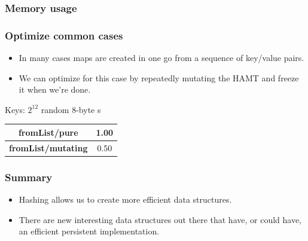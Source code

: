 \documentclass[xetex,mathserif,serif]{beamer}
\newcommand{\code}[1]{\mbox{\texttt{\small{\color{CodeColor}{#1}}}}}
\begin{document}
\begin{frame}
  \frametitle{Memory usage}
\end{frame}

\begin{frame}
  \frametitle{Optimize common cases}
  \begin{itemize}
  \item In many cases maps are created in one go from a sequence of
    key/value pairs.
  \item We can optimize for this case by repeatedly mutating the HAMT
    and freeze it when we're done.
  \end{itemize}

  \bigskip
  Keys: $2^{12}$ random 8-byte \code{ByteString}s

  \bigskip
  \begin{tabular}{|c|c|}
    \hline \textbf{fromList/pure} & 1.00 \\
    \hline \textbf{fromList/mutating} & 0.50 \\
    \hline
  \end{tabular}
\end{frame}

\begin{frame}
  \frametitle{Summary}
  \begin{itemize}
  \item Hashing allows us to create more efficient data structures.
  \item There are new interesting data structures out there that have,
    or could have, an efficient persistent implementation.
  \end{itemize}
\end{frame}
\end{document}
